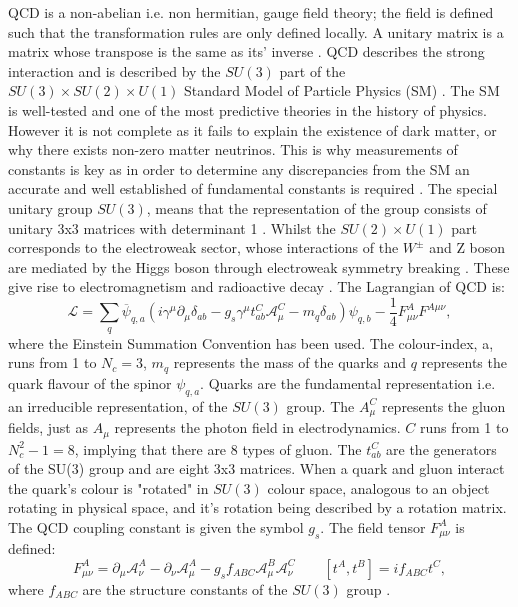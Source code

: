 \documentclass[12pt, onecolumn]{revtex4}    %
\begin{document}
QCD is a non-abelian i.e. non hermitian, gauge field theory; the field is defined such that the transformation rules are only defined locally. A unitary matrix is a matrix whose transpose is the same as its' inverse \cite{BOOK}. QCD describes the strong interaction and is described by the ${SU(3)}$ part of the ${SU(3)\times SU(2) \times U(1)}$ Standard Model of Particle Physics (SM) \cite{PPB}. The SM is well-tested and one of the most predictive theories in the history of physics. However it is not complete as it fails to explain the existence of dark matter, or why there exists non-zero matter neutrinos. This is why measurements of constants is  key as in order to determine any discrepancies from the SM an accurate and well established of fundamental constants is required \cite{PHD}. The special unitary group ${SU(3)}$,  means that the representation of the group consists of unitary 3x3 matrices with determinant 1 \cite{GROUP}.  Whilst the ${SU(2) \times U(1)}$ part corresponds to the electroweak sector, whose interactions of the  ${W^\pm}$ and Z boson are mediated by the Higgs boson through electroweak symmetry breaking . These give rise to electromagnetism and radioactive decay \cite{PHD}. The Lagrangian of QCD is: \begin{equation} \mathcal{L} = \sum_ {q} \overline{\psi}_{q,a} (i\gamma^\mu \partial_\mu \delta_{ab} - g_s \gamma^\mu t_{ab}^C \mathcal{A}_\mu^C  - m_q\delta_{ab})\psi_{q,b} - \frac{1}{4} F_{\mu\nu}^A F^{A \mu\nu}, \end{equation} where the Einstein Summation Convention has been used. The colour-index, a, runs from 1 to  ${N_c = 3}$, ${m_q}$ represents the mass of the quarks and ${q}$ represents the quark flavour of the spinor $\psi_{q,a}$. Quarks are the fundamental representation i.e. an irreducible representation, of the ${SU(3)}$ group. The ${A_\mu^C}$ represents the gluon fields,  just as ${A_\mu}$ represents the photon field in electrodynamics. ${C}$ runs from 1 to ${N_c^2 -1 = 8}$, implying that there are 8 types of gluon. The ${t_{ab}^C}$ are the generators of the SU(3) group and are eight 3x3 matrices. When a quark and gluon interact the quark's colour is "rotated" in ${SU(3)}$ colour space, analogous to an object rotating in physical space, and it's rotation being described by a rotation matrix. The QCD coupling constant is given the symbol ${g_s}$. The field tensor ${F_{\mu\nu}^A}$ is defined: \begin{equation}F_{\mu\nu}^A  = \partial_\mu \mathcal{A}_\nu^A  - \partial_\nu \mathcal{A}_\mu^A - g_s f_{ABC} \mathcal{A}_\mu^B \mathcal{A}_\nu^C  \qquad [t^A,t^B] = if_{ABC}t^C,  \end{equation} where ${f_{ABC}}$ are the structure constants of the ${SU(3)}$ group \cite{PPB}.
\end{document}
